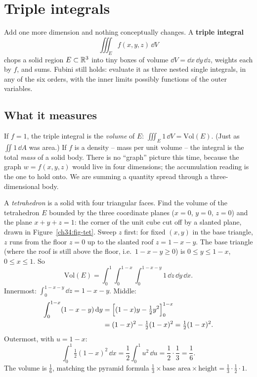 \section{Triple integrals}
\label{ch34:triple}

Add one more dimension and nothing conceptually changes. A \textbf{triple
integral}
\[
  \iiint_E f(x,y,z)\,\dd V
\]
chops a solid region $E\subset\mathbb{R}^3$ into tiny boxes of volume
$\dd V=\dd x\,\dd y\,\dd z$, weights each by $f$, and sums. Fubini still holds:
evaluate it as three nested single integrals, in any of the six orders, with the
inner limits possibly functions of the outer variables.

\subsection{What it measures}

If $f=1$, the triple integral is the \emph{volume} of $E$:
$\iiint_E 1\,\dd V=\text{Vol}(E)$. (Just as $\iint 1\,\dd A$ was area.) If $f$ is
a density -- mass per unit volume -- the integral is the total \emph{mass} of a
solid body. There is no ``graph'' picture this time, because the graph
$w=f(x,y,z)$ would live in four dimensions; the accumulation reading is the one
to hold onto. We are summing a quantity spread through a three-dimensional body.

\begin{example}
\label{ch34:ex-tet}
A \emph{tetrahedron} is a solid with four triangular faces. Find the volume of
the tetrahedron $E$ bounded by the three coordinate planes ($x=0$, $y=0$, $z=0$)
and the plane $x+y+z=1$: the corner of the unit cube cut off by a slanted plane,
drawn in Figure~\ref{ch34:fig-tet}. Sweep $z$ first:
for fixed $(x,y)$ in the base triangle, $z$ runs from the floor $z=0$ up to the
slanted roof $z=1-x-y$. The base triangle (where the roof is still above the
floor, i.e.\ $1-x-y\ge 0$) is $0\le y\le 1-x$, $0\le x\le 1$. So
\[
  \text{Vol}(E)=\int_0^1\!\int_0^{1-x}\!\int_0^{1-x-y} 1\,\dd z\,\dd y\,\dd x .
\]
Innermost: $\int_0^{1-x-y}\dd z=1-x-y$. Middle:
\begin{align*}
  \int_0^{1-x}(1-x-y)\,\mathrm{d} y
  &= \Big[(1-x)y-\tfrac12 y^2\Big]_{0}^{1-x} \\
  &= (1-x)^2-\tfrac12(1-x)^2=\tfrac12(1-x)^2 .
\end{align*}
Outermost, with $u=1-x$:
\[
  \int_0^1\tfrac12(1-x)^2\,\dd x=\frac12\int_0^1 u^2\,\dd u=\frac12\cdot\frac13=\frac16 .
\]
The volume is $\tfrac16$, matching the pyramid formula
$\tfrac13\times\text{base area}\times\text{height}=\tfrac13\cdot\tfrac12\cdot 1$.
\end{example}

